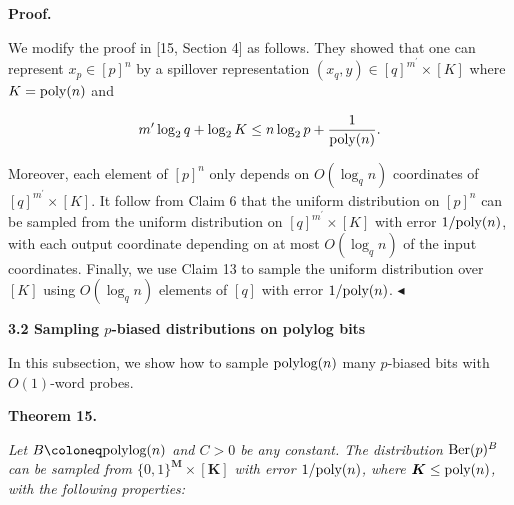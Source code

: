 



\par\medskip\noindent\textbf{Proof.}\par




We modify the proof in [15, Section 4] as follows.
They showed that one can represent $x_{p}\in[p]^{n}$ by a spillover representation $(x_{q},y)\in[q]^{m^{\prime}}\times[K]$ where $K=\textnormal{poly}(n)$ and\par


\[\begin{gathered}
m^{\prime}\log_{2}q+\log_{2}K\leq n\log_{2}p+\frac{1}{\textnormal{poly}(n)}.
\end{gathered}\]


Moreover, each element of $[p]^{n}$ only depends on $O(\log_{q}n)$ coordinates of $[q]^{m^{\prime}}\times[K]$.
It follow from Claim 6 that the uniform distribution on $[p]^{n}$ can be sampled from the uniform distribution on $[q]^{m^{\prime}}\times[K]$ with error $1/\textnormal{poly}(n)$, with each output coordinate depending on at most $O(\log_{q}n)$ of the input coordinates.
Finally, we use Claim 13 to sample the uniform distribution over $[K]$ using $O(\log_{q}n)$ elements of $[q]$ with error $1/\textnormal{poly}(n)$.
$\blacktriangleleft$\par






\par\medskip\noindent\textbf{
3.2 Sampling $p$-biased distributions on polylog bits}\par




In this subsection, we show how to sample $\textnormal{polylog}(n)$ many $p$-biased bits with $O(1)$-word probes.\par





\par\medskip\noindent\textbf{
\textbf{Theorem 15}\textbf{.}
}\par



\emph{Let $B\coloneq\textnormal{polylog}(n)$ and $C>0$ be any constant.
The distribution $\textnormal{Ber}(p)^{B}$ can be sampled from $\{0,1\}^{\boldsymbol{M}}\times[\boldsymbol{K}]$ with error $1/\textnormal{poly}(n)$, where $\boldsymbol{K}\leq\textnormal{poly}(n)$, with the following properties:}\par


